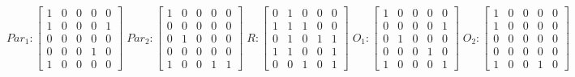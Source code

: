      $$
        Par_{1} : \begin{bmatrix}
            1 & 0 & 0 & 0 & 0 \\
            1 & 0 & 0 & 0 & 1 \\
            0 & 0 & 0 & 0 & 0 \\
			0 & 0 & 0 & 1 & 0 \\
            1 & 0 & 0 & 0 & 0 
        \end{bmatrix}
        \;
        Par_{2} : \begin{bmatrix}
            1 & 0 & 0 & 0 & 0 \\
            0 & 0 & 0 & 0 & 0 \\
            0 & 1 & 0 & 0 & 0 \\
            0 & 0 & 0 & 0 & 0 \\
            1 & 0 & 0 & 1 & 1
        \end{bmatrix}
        \;
        R : \begin{bmatrix}
            0 & 1 & 0 & 0 & 0 \\
            1 & 1 & 1 & 0 & 0 \\
            0 & 1 & 0 & 1 & 1 \\
            1 & 1 & 0 & 0 & 1 \\
            0 & 0 & 1 & 0 & 1
        \end{bmatrix}
        \;
        O_{1} : \begin{bmatrix}
            1 & 0 & 0 & 0 & 0 \\
            0 & 0 & 0 & 0 & 1 \\
            0 & 1 & 0 & 0 & 0 \\
            0 & 0 & 0 & 1 & 0 \\
            1 & 0 & 0 & 0 & 1
        \end{bmatrix}
        \;
        O_{2} : \begin{bmatrix}
            1 & 0 & 0 & 0 & 0 \\
            1 & 0 & 0 & 0 & 0 \\
            0 & 0 & 0 & 0 & 0 \\
            0 & 0 & 0 & 0 & 0 \\
            1 & 0 & 0 & 1 & 0
        \end{bmatrix}
    $$ 
